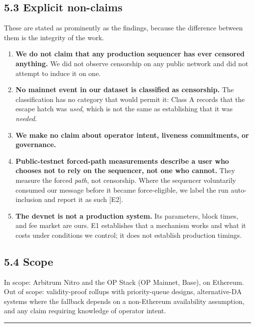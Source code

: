 \documentclass[conference]{IEEEtran}
\providecommand{\tightlist}{\setlength{\itemsep}{0pt}\setlength{\parskip}{0pt}}
\renewcommand{\_}{\textunderscore\allowbreak}
\begin{document}
\subsection{5.3 Explicit non-claims}\label{explicit-non-claims}

These are stated as prominently as the findings, because the difference
between them is the integrity of the work.

\begin{enumerate}
\def\labelenumi{\arabic{enumi}.}
\tightlist
\item
  \textbf{We do not claim that any production sequencer has ever
  censored anything.} We did not observe censorship on any public
  network and did not attempt to induce it on one.
\item
  \textbf{No mainnet event in our dataset is classified as censorship.}
  The classification has no category that would permit it: Class A
  records that the escape hatch was \emph{used}, which is not the same
  as establishing that it was \emph{needed}.
\item
  \textbf{We make no claim about operator intent, liveness commitments,
  or governance.}
\item
  \textbf{Public-testnet forced-path measurements describe a user who
  chooses not to rely on the sequencer, not one who cannot.} They
  measure the forced \emph{path}, not censorship. Where the sequencer
  voluntarily consumed our message before it became force-eligible, we
  label the run auto-inclusion and report it as such {[}E2{]}.
\item
  \textbf{The devnet is not a production system.} Its parameters, block
  times, and fee market are ours. E1 establishes that a mechanism works
  and what it costs under conditions we control; it does not establish
  production timings.
\end{enumerate}

\subsection{5.4 Scope}\label{scope}

In scope: Arbitrum Nitro and the OP Stack (OP Mainnet, Base), on
Ethereum. Out of scope: validity-proof rollups with priority-queue
designs, alternative-DA systems where the fallback depends on a
non-Ethereum availability assumption, and any claim requiring knowledge
of operator intent.

\begin{center}\rule{0.5\linewidth}{0.5pt}\end{center}
\end{document}
